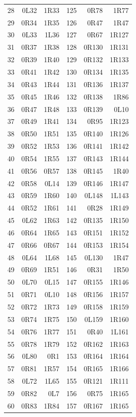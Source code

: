 {\begin{longtable}{rrr@{\hspace{2.5em}}rrr}
28 & 0L32 & 1R33 & 125 & 0R78 & 1R77\\
29 & 0R34 & 1R35 & 126 & 0R47 & 1R47\\
30 & 0L33 & 1L36 & 127 & 0R67 & 1R127\\
31 & 0R37 & 1R38 & 128 & 0R130 & 1R131\\
32 & 0R39 & 1R40 & 129 & 0R132 & 1R133\\
33 & 0R41 & 1R42 & 130 & 0R134 & 1R135\\
34 & 0R43 & 1R44 & 131 & 0R136 & 1R137\\
35 & 0R45 & 1R46 & 132 & 0R138 & 1R86\\
36 & 0R47 & 1R48 & 133 & 0R139 & 0L10\\
37 & 0R49 & 1R41 & 134 & 0R95 & 1R123\\
38 & 0R50 & 1R51 & 135 & 0R140 & 1R126\\
39 & 0R52 & 1R53 & 136 & 0R141 & 1R142\\
40 & 0R54 & 1R55 & 137 & 0R143 & 1R144\\
41 & 0R56 & 0R57 & 138 & 0R145 & 1R40\\
42 & 0R58 & 0L14 & 139 & 0R146 & 1R147\\
43 & 0R59 & 1R60 & 140 & 0L148 & 1L143\\
44 & 0R52 & 1R61 & 141 & 0R28 & 1R149\\
45 & 0L62 & 1R63 & 142 & 0R135 & 1R150\\
46 & 0R64 & 1R65 & 143 & 0R151 & 1R152\\
47 & 0R66 & 0R67 & 144 & 0R153 & 1R154\\
48 & 0L64 & 1L68 & 145 & 0L130 & 1R47\\
49 & 0R69 & 1R51 & 146 & 0R31 & 1R50\\
50 & 0L70 & 0L15 & 147 & 0R155 & 1R146\\
51 & 0R71 & 0L10 & 148 & 0R156 & 1R157\\
52 & 0R72 & 1R73 & 149 & 0R158 & 1R159\\
53 & 0R74 & 1R75 & 150 & 0L159 & 1R160\\
54 & 0R76 & 1R77 & 151 & 0R40 & 1L161\\
55 & 0R78 & 1R79 & 152 & 0R162 & 1R163\\
56 & 0L80 & 0R1 & 153 & 0R164 & 1R164\\
57 & 0R81 & 1R57 & 154 & 0R165 & 1R166\\
58 & 0L72 & 1L65 & 155 & 0R121 & 1R111\\
59 & 0R82 & 0L7 & 156 & 0R75 & 1R165\\
60 & 0R83 & 1R84 & 157 & 0R167 & 1R165\\

\end{longtable}}
